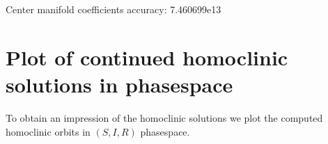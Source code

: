 \documentclass[letterpaper,10pt,english]{jupyterBook}
\begin{document}
\begin{sphinxVerbatim}[commandchars=\\\{\}]
Center manifold coefficients\PYGZsq{} accuracy: 7.460699e\PYGZhy{}13
\end{sphinxVerbatim}

\noindent{}


\section{Plot of continued homoclinic solutions in phase\sphinxhyphen{}space}
\label{\detokenize{SIRmodel:plot-of-continued-homoclinic-solutions-in-phase-space}}
\sphinxAtStartPar
To obtain an impression of the  homoclinic solutions we plot the computed
homoclinic orbits in \((S,I,R)\) phase\sphinxhyphen{}space.
\end{document}
